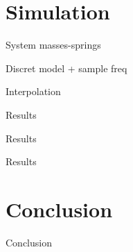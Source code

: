 \documentclass{beamer}
\begin{document}
\section{Simulation}

\begin{frame}{System masses-springs}
\end{frame}


\begin{frame}{Discret model + sample freq}
\end{frame}

\begin{frame}{Interpolation}
\end{frame}

\begin{frame}{Results}
\end{frame}

\begin{frame}{Results}
\end{frame}

\begin{frame}{Results}
\end{frame}



\section{Conclusion}

\begin{frame}{Conclusion}
\end{frame}


  
\end{document}
